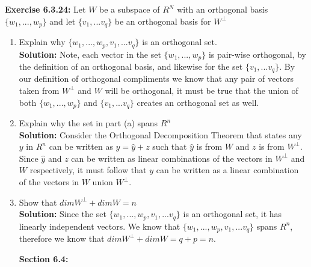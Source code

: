 \documentclass{amsart}
\begin{document}
\noindent\textbf{Exercise 6.3.24: }Let $W$ be a subspace of $R^N$ with an orthogonal basis $\{w_1,...,w_p\}$ and let $\{v_1,...v_q\}$ be an orthogonal basis for $W^\perp$\\
\begin{enumerate}

\item Explain why $\{w_1,...,w_p,v_1,...v_q\}$ is an orthogonal set.\\
\textbf{Solution: } Note, each vector in the set $\{w_1,...,w_p\}$ is pair-wise orthogonal, by the definition of an orthogonal basis, and likewise for the set $\{v_1,...v_q\}$. By our definition of orthogonal compliments we know that any pair of vectors taken from $W^\perp$ and $W$ will be orthogonal, it must be true that the union of both $\{w_1,...,w_p\}$ and $\{v_1,...v_q\}$ creates an orthogonal set as well.
\vspace{1in}


\item Explain why the set in part (a) spans $R^n$\\
\textbf{Solution: } Consider the Orthogonal Decomposition Theorem that states any $y$ in $R^n$ can be written as $y = \hat{y} + z$ such that $\hat{y}$ is from $W$ and $z$ is from $W^\perp$. Since $\hat{y}$ and $z$ can be written as linear combinations of the vectors in  $W^\perp$ and $W$ respectively, it must follow that $y$ can be written as a linear combination of the vectors in $W$ union $W^\perp$.

\vspace{1in}


\item Show that $dim W^\perp + dim W = n$\\
\textbf{Solution: } Since the set $\{w_1,...,w_p,v_1,...v_q\}$ is an orthogonal set, it has linearly independent vectors. We know that $\{w_1,...,w_p,v_1,...v_q\}$ spans $R^n$, therefore we know that $dim W^\perp + dim W  = q + p = n$.
\vspace{1in}

\vspace{1in}





{\huge\textbf{Section 6.4:}}\\\\




\end{enumerate}
\end{document}
